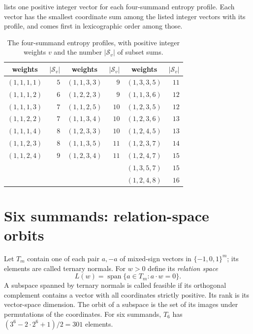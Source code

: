 \documentclass[11pt,a4paper]{article}
\numberwithin{equation}{section}
\theoremstyle{remark}
\begin{document}
 lists one positive integer vector for each four-summand entropy profile. Each vector has the smallest coordinate sum among the listed integer vectors with its profile, and comes first in lexicographic order among those.

\begin{table}[ht]
\centering\small
\begin{tabular}{crcrcr}
\toprule
weights & $|\mathcal S_v|$ & weights & $|\mathcal S_v|$ & weights & $|\mathcal S_v|$\\
\midrule
$(1,1,1,1)$ & $5$ & $(1,1,3,3)$ & $9$ & $(1,3,3,5)$ & $11$\\
$(1,1,1,2)$ & $6$ & $(1,2,2,3)$ & $9$ & $(1,1,3,6)$ & $12$\\
$(1,1,1,3)$ & $7$ & $(1,1,2,5)$ & $10$ & $(1,2,3,5)$ & $12$\\
$(1,1,2,2)$ & $7$ & $(1,1,3,4)$ & $10$ & $(1,2,3,6)$ & $13$\\
$(1,1,1,4)$ & $8$ & $(1,2,3,3)$ & $10$ & $(1,2,4,5)$ & $13$\\
$(1,1,2,3)$ & $8$ & $(1,1,3,5)$ & $11$ & $(1,2,3,7)$ & $14$\\
$(1,1,2,4)$ & $9$ & $(1,2,3,4)$ & $11$ & $(1,2,4,7)$ & $15$\\
 & & & & $(1,3,5,7)$ & $15$\\
 & & & & $(1,2,4,8)$ & $16$\\
\bottomrule
\end{tabular}
\caption{The four-summand entropy profiles, with positive integer weights $v$ and the number $|\mathcal S_v|$ of subset sums.}\label{tab:four}
\end{table}

\section{Six summands: relation-space orbits}\label{sec:six}

Let $T_m$ contain one of each pair $a,-a$ of mixed-sign vectors in $\{-1,0,1\}^m$; its elements are called ternary normals. For $w>0$ define its \emph{relation space}
\[
 L(w)=\operatorname{span}\{a\in T_m:a\cdot w=0\}.
\]
A subspace spanned by ternary normals is called feasible if its orthogonal complement contains a vector with all coordinates strictly positive. Its rank is its vector-space dimension. The orbit of a subspace is the set of its images under permutations of the coordinates. For six summands, $T_6$ has
$(3^6-2\cdot2^6+1)/2=301$ elements.
\end{document}
